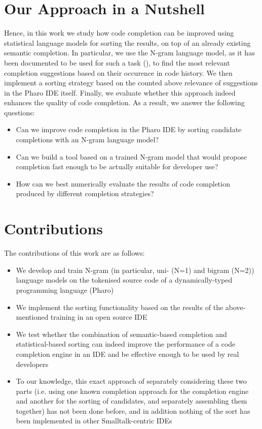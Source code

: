 \section{Our Approach in a Nutshell}
\label{sec:Introduction-Approach}
Hence, in this work we study how code completion can be improved using statistical language models for sorting the results, on top of an already existing semantic completion. In particular, we use the N-gram language model, as it has been documented to be used for such a task (\cite{Hind12a}), to find the most relevant completion suggestions based on their occurence in code history. We then implement a sorting strategy based on the counted above relevance of suggestions in the Pharo IDE itself. Finally, we evaluate whether this approach indeed enhances the quality of code completion. As a result, we answer the following questions:
\begin{itemize}
    \item Can we improve code completion in the Pharo IDE by sorting candidate completions with an N-gram language model?
    \item Can we build a tool based on a trained N-gram model that would propose completion fast enough to be actually suitable for developer use? 
    \item How can we best numerically evaluate the results of code completion produced by different completion strategies?
\end{itemize}

\section{Contributions}
The contributions of this work are as follows:
\begin{itemize}
    \item We develop and train N-gram (in particular, uni- (N=1) and bigram (N=2)) language models on the tokenised source code of a dynamically-typed programming language (Pharo)
    \item We implement the sorting functionality based on the results of the above-mentioned training in an open source IDE
    \item We test whether the combination of semantic-based completion and statistical-based sorting can indeed improve the performance of a code completion engine in an IDE and be effective enough to be used by real developers
    \item To our knowledge, this exact approach of separately considering these two parts (i.e. using one known completion approach for the completion engine and another for the sorting of candidates, and separately assembling them together) has not been done before, and in addition nothing of the sort has been implemented in other Smalltalk-centric IDEs
\end{itemize}

